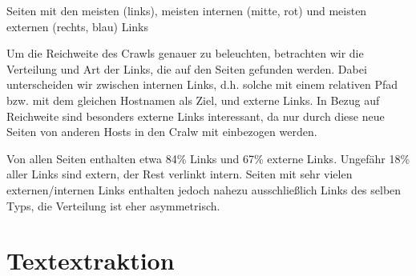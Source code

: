 \documentclass[a4paper,12pt,titlepage=false]{scrreprt}
\begin{document}
\centerline{Seiten mit den meisten (links), meisten internen (mitte, rot) und meisten externen (rechts, blau) Links}
\vspace{-.2cm}

Um die Reichweite des Crawls genauer zu beleuchten, betrachten wir die Verteilung und Art der Links, die auf den Seiten gefunden werden. Dabei unterscheiden wir zwischen internen Links, d.h. solche mit einem relativen Pfad bzw. mit dem gleichen Hostnamen als Ziel, und externe Links. In Bezug auf Reichweite sind besonders externe Links interessant, da nur durch diese neue Seiten von anderen Hosts in den Cralw mit einbezogen werden.

Von allen Seiten enthalten etwa 84\% Links und 67\% externe Links. Ungefähr 18\% aller Links sind extern, der Rest verlinkt intern. Seiten mit sehr vielen externen/internen Links enthalten jedoch nahezu ausschließlich Links des selben Typs, die Verteilung ist eher asymmetrisch.

\chapter{Textextraktion}
\end{document}
